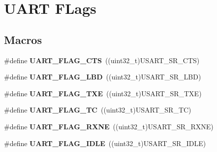 \hypertarget{group___u_a_r_t___flags}{}\section{U\+A\+RT F\+Lags}
\label{group___u_a_r_t___flags}
\subsection*{Macros}
\begin{DoxyCompactItemize}
\item 
\mbox{\label{group___u_a_r_t___flags_ga5435edd22ff23de7187654362c48e0b1}} 
\#define {\bfseries U\+A\+R\+T\+\_\+\+F\+L\+A\+G\+\_\+\+C\+TS}~((uint32\+\_\+t)U\+S\+A\+R\+T\+\_\+\+S\+R\+\_\+\+C\+TS)
\item 
\mbox{\label{group___u_a_r_t___flags_ga8e3215245044c34b2d9a2698d93dfcd7}} 
\#define {\bfseries U\+A\+R\+T\+\_\+\+F\+L\+A\+G\+\_\+\+L\+BD}~((uint32\+\_\+t)U\+S\+A\+R\+T\+\_\+\+S\+R\+\_\+\+L\+BD)
\item 
\mbox{\label{group___u_a_r_t___flags_gad39c017d415a7774c82eb07413a9dbe4}} 
\#define {\bfseries U\+A\+R\+T\+\_\+\+F\+L\+A\+G\+\_\+\+T\+XE}~((uint32\+\_\+t)U\+S\+A\+R\+T\+\_\+\+S\+R\+\_\+\+T\+XE)
\item 
\mbox{\label{group___u_a_r_t___flags_ga82e68a0ee4a8b987a47c66fc6f744894}} 
\#define {\bfseries U\+A\+R\+T\+\_\+\+F\+L\+A\+G\+\_\+\+TC}~((uint32\+\_\+t)U\+S\+A\+R\+T\+\_\+\+S\+R\+\_\+\+TC)
\item 
\mbox{\label{group___u_a_r_t___flags_ga9d1b2860d84a87abb05c3b2fed3c108c}} 
\#define {\bfseries U\+A\+R\+T\+\_\+\+F\+L\+A\+G\+\_\+\+R\+X\+NE}~((uint32\+\_\+t)U\+S\+A\+R\+T\+\_\+\+S\+R\+\_\+\+R\+X\+NE)
\item 
\mbox{\label{group___u_a_r_t___flags_ga5d7a320c505672f7508e3bd99f532a69}} 
\#define {\bfseries U\+A\+R\+T\+\_\+\+F\+L\+A\+G\+\_\+\+I\+D\+LE}~((uint32\+\_\+t)U\+S\+A\+R\+T\+\_\+\+S\+R\+\_\+\+I\+D\+LE)
\item 
\mbox{\label{group___u_a_r_t___flags_ga335a5b0f61512223bbc406b38c95b2d6}} 

\end{DoxyCompactItemize}
